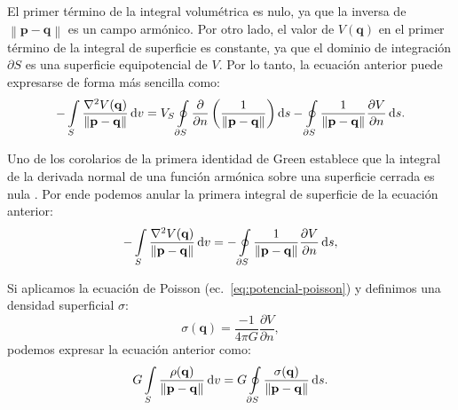 El primer término de la integral volumétrica es nulo, ya que la inversa de
$\left\lVert \mathbf{p} - \mathbf{q} \right\rVert$ es un campo armónico.
Por otro lado, el valor de $V(\mathbf{q})$ en el primer término de la integral
de superficie es constante, ya que el dominio de integración $\partial S$ es
una superficie equipotencial de $V$.
Por lo tanto, la ecuación anterior puede expresarse de forma más sencilla como:
%
\begin{equation}
    - \int\limits_S
        \frac{\nabla^2 V(\mathbf{q})}{\left\lVert \mathbf{p} - \mathbf{q}
            \right\rVert}
    \mathop{}\!\textnormal{d} v
    =
    V_S
    \oint\limits_{\partial S}
        \frac{\partial}{\partial n}
        \left(
            \frac{1}{\left\lVert \mathbf{p} - \mathbf{q} \right\rVert}
        \right)
    \mathop{}\!\textnormal{d} s
    - \oint\limits_{\partial S}
        \frac{1}{\left\lVert \mathbf{p} - \mathbf{q} \right\rVert}
        \frac{\partial V}{\partial n}
    \mathop{}\!\textnormal{d} s.
\end{equation}

Uno de los corolarios de la primera identidad de Green establece que la
integral de la derivada normal de una función armónica  sobre una superficie
cerrada es nula \citep[][p.~20]{blakely1995}. Por ende podemos anular la
primera integral de superficie de la ecuación anterior:
%
\begin{equation}
    - \int\limits_S
        \frac{\nabla^2 V(\mathbf{q})}{\left\lVert \mathbf{p} - \mathbf{q}
            \right\rVert}
    \mathop{}\!\textnormal{d} v
    =
    - \oint\limits_{\partial S}
        \frac{1}{\left\lVert \mathbf{p} - \mathbf{q} \right\rVert}
        \frac{\partial V}{\partial n}
    \mathop{}\!\textnormal{d} s,
\end{equation}

Si aplicamos la ecuación de Poisson (ec.~\ref{eq:potencial-poisson})
y definimos una densidad superficial $\sigma$:
%
\begin{equation}
    \sigma(\mathbf{q}) =
    \frac{-1}{4\pi G} \frac{\partial V}{\partial n},
\end{equation}
%
podemos expresar la ecuación anterior como:
%
\begin{equation}
    G \int\limits_S
        \frac{\rho(\mathbf{q})}{\left\lVert \mathbf{p} - \mathbf{q}
            \right\rVert}
    \mathop{}\!\textnormal{d} v
    =
    G \oint\limits_{\partial S}
        \frac{\sigma(\mathbf{q})}{\left\lVert \mathbf{p} - \mathbf{q}
            \right\rVert}
    \mathop{}\!\textnormal{d} s.
\end{equation}

